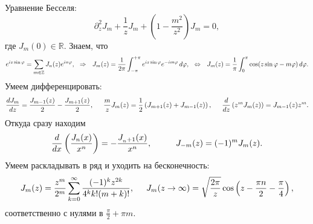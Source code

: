 
Уравнение Бесселя:
\begin{equation*}
    \partial_z^2 J_m + \frac{1}{z} J_m + \left(1 - \frac{m^2}{z^2}\right) J_m = 0,
\end{equation*}
где $J_m(0) \in \mathbb{R}$. Знаем, что
\begin{equation*}
    e^{i z \sin \varphi} = \sum_{m \in \mathbb{Z}} 
    J_n (z) e^{i n \varphi},
    \hspace{0.25cm} \Rightarrow \hspace{0.25cm}
    J_m (z) = \frac{1}{2\pi} \int_{-\pi}^{+\pi}e^{i z \sin \varphi} e^{- i m \varphi} \, d \varphi,
    \hspace{2.5 mm} 
    \Leftrightarrow
    \hspace{2.5 mm} 
    J_m (z) = \frac{1}{\pi} \int_{0}^{\pi} \cos(z \sin \varphi - m \varphi) \, d \varphi.
\end{equation*}
Умеем дифференцировать:
\begin{equation*}
    \frac{d J_m}{d z} = \frac{J_{m-1} (z)}{2} - \frac{J_{m+1}(z)}{2},
    \hspace{5 mm}
    \frac{m}{z} J_m (z) = \frac{1}{2} \left(J_{m+1} (z) + J_{m-1}(z)\right),
    \hspace{5 mm} 
    \frac{d }{d z} \left(z^m J_m (z)\right) = J_{m-1} (z) z^m.
\end{equation*}
Откуда сразу находим
\begin{equation*}
    \frac{d }{d x} \left(\frac{J_n (x)}{x^n }\right) = - \frac{J_{_n+1}(x)}{x^n},
    \hspace{10 mm} 
    J_{-m} (z) = (-1)^m J_m (z).
\end{equation*}
Умеем раскладывать в ряд и уходить на бесконечность:
\begin{equation*}
    J_m (z) = \frac{z^m}{2^m} \sum_{k=0}^{\infty} \frac{(-1)^k z^{2k}}{4^k k! (m+k)!},
    \hspace{5 mm} 
    J_m (z \to \infty) = \sqrt{\frac{2 \pi}{z}} \cos\left(
        z - \frac{\pi n }{2} - \frac{\pi}{4}
    \right),
\end{equation*}
соответственно с нулями в $\frac{\pi}{2} + \pi m$. 

